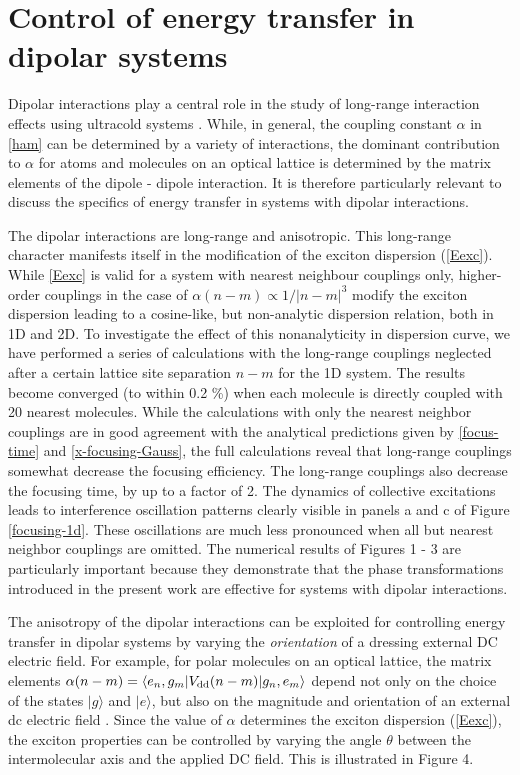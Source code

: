 \section{Control of energy transfer in dipolar systems}
\label{sec:controlEnergyTransfer}

Dipolar interactions play a central role in the study of long-range interaction effects using ultracold systems \cite{our-njp-review}.
While, in general, the coupling constant $\alpha$ in \autoref{ham} can be determined by a variety of interactions, the dominant contribution to $\alpha$ for atoms and molecules on an optical lattice is determined by the matrix elements of the dipole - dipole interaction. It is therefore particularly relevant to discuss the specifics of energy transfer in systems with dipolar interactions. 

The dipolar interactions are long-range and anisotropic. This long-range character
manifests itself in the modification of the exciton dispersion (\ref{Eexc}). While \autoref{Eexc} is valid for a system 
with nearest neighbour couplings only, higher-order couplings in the case of $\alpha(n-m) \propto 1/ |n-m|^3$ 
modify the exciton dispersion leading to a cosine-like, 
but non-analytic dispersion relation, both in 1D  and 2D. 
To investigate the effect of this nonanalyticity in dispersion curve, we have performed a series of calculations with the long-range couplings neglected 
after a certain lattice site separation $n-m$ for the 1D system. The results become  converged (to within 0.2 \%) when
 each molecule is directly coupled with 20 nearest molecules. While the calculations with only the nearest neighbor
 couplings are in good agreement  with the analytical predictions given by \autoref{focus-time} and \autoref{x-focusing-Gauss}, the full calculations reveal that long-range 
couplings somewhat decrease the focusing efficiency. The long-range couplings also decrease the focusing time, 
by up to a factor of 2. The dynamics of collective excitations leads to interference oscillation patterns clearly 
visible in panels a and c of Figure \ref{focusing-1d}. These oscillations are much less pronounced when all but nearest
 neighbor couplings are omitted. The numerical results of Figures 1 - 3 are particularly important
 because they demonstrate that the phase transformations introduced in the present work are effective  for 
systems with dipolar interactions. 


The anisotropy of the dipolar interactions can be exploited for controlling energy transfer in dipolar systems by varying the {\it orientation} of a dressing external DC electric field. 
For example,  for polar molecules on an optical lattice,  
the matrix elements  $\alpha(n-m) = \langle e_{n} , g_{m} | {V}_{\rm dd}(n-m) | g_{n}, e_{m} \rangle$ depend not only on the choice of
 the states $|g\rangle$ and $|e\rangle$, but also on the magnitude and orientation of an external dc electric field
\cite{biexcitons, felipe}. Since the value of $\alpha$ determines the exciton dispersion (\ref{Eexc}),
 the exciton properties can be controlled by varying the angle $\theta$ between the intermolecular axis
and the applied DC field. This is illustrated in Figure 4. 

